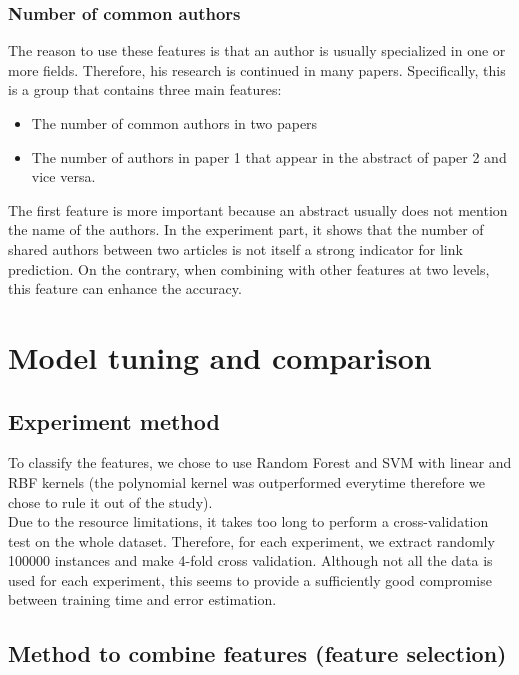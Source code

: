 \documentclass{article}
\begin{document}
\subsubsection{Number of common authors}

The reason to use these features is that an author is usually specialized in one or more fields. Therefore, his research is continued in many papers. Specifically, this is a group that contains three main features:
\begin{itemize}
\item The number of common authors in two papers
\item The number of authors in paper 1 that appear in the abstract of paper 2 and vice versa.
\end{itemize}
The first feature is more important because an abstract usually does not mention the name of the authors. In the experiment part, it shows that the number of shared authors between two articles is not itself a strong indicator for link prediction. On the contrary, when combining with other features at two levels, this feature can enhance the accuracy.

\section{Model tuning and comparison}
\label{sec:experiments}

\subsection{Experiment method}

To classify the features, we chose to use Random Forest and SVM with linear and RBF kernels (the polynomial kernel was outperformed everytime therefore we chose to rule it out of the study).\\
Due to the resource limitations, it takes too long to perform a cross-validation test on the whole dataset. Therefore, for each experiment, we extract randomly 100000 instances and make 4-fold cross validation. Although not all the data is used for each experiment, this seems to provide a sufficiently good compromise between training time and error estimation.

\subsection{Method to combine features (feature selection)}
\end{document}
